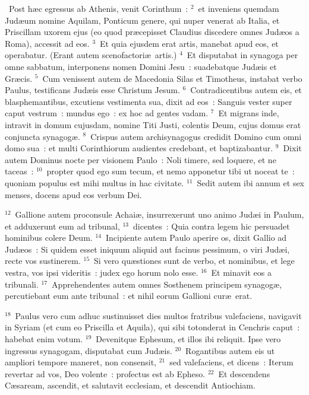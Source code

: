 ~Post h\ae c egressus ab Athenis, venit Corinthum~:
${}^{2}$~et inveniens quemdam Jud\ae um nomine Aquilam, Ponticum genere, qui nuper venerat ab Italia, et Priscillam uxorem ejus (eo quod pr\ae cepisset Claudius discedere omnes Jud\ae os a Roma), accessit ad eos.
${}^{3}$~Et quia ejusdem erat artis, manebat apud eos, et operabatur. (Erant autem scenofactori\ae\ artis.)
${}^{4}$~Et disputabat in synagoga per omne sabbatum, interponens nomen Domini Jesu~: suadebatque Jud\ae is et Gr\ae cis.
${}^{5}$~Cum venissent autem de Macedonia Silas et Timotheus, instabat verbo Paulus, testificans Jud\ae is esse Christum Jesum.
${}^{6}$~Contradicentibus autem eis, et blasphemantibus, excutiens vestimenta sua, dixit ad eos~: Sanguis vester super caput vestrum~: mundus ego~: ex hoc ad gentes vadam.
${}^{7}$~Et migrans inde, intravit in domum cujusdam, nomine Titi Justi, colentis Deum, cujus domus erat conjuncta synagog\ae .
${}^{8}$~Crispus autem archisynagogus credidit Domino cum omni domo sua~: et multi Corinthiorum audientes credebant, et baptizabantur.
${}^{9}$~Dixit autem Dominus nocte per visionem Paulo~: Noli timere, sed loquere, et ne taceas~:
${}^{10}$~propter quod ego sum tecum, et nemo apponetur tibi ut noceat te~: quoniam populus est mihi multus in hac civitate.
${}^{11}$~Sedit autem ibi annum et sex menses, docens apud eos verbum Dei.


${}^{12}$~Gallione autem proconsule Achai\ae , insurrexerunt uno animo Jud\ae i in Paulum, et adduxerunt eum ad tribunal,
${}^{13}$~dicentes~: Quia contra legem hic persuadet hominibus colere Deum.
${}^{14}$~Incipiente autem Paulo aperire os, dixit Gallio ad Jud\ae os~: Si quidem esset iniquum aliquid aut facinus pessimum, o viri Jud\ae i, recte vos sustinerem.
${}^{15}$~Si vero qu\ae stiones sunt de verbo, et nominibus, et lege vestra, vos ipsi videritis~: judex ego horum nolo esse.
${}^{16}$~Et minavit eos a tribunali.
${}^{17}$~Apprehendentes autem omnes Sosthenem principem synagog\ae , percutiebant eum ante tribunal~: et nihil eorum Gallioni cur\ae\ erat.


${}^{18}$~Paulus vero cum adhuc sustinuisset dies multos fratribus valefaciens, navigavit in Syriam (et cum eo Priscilla et Aquila), qui sibi totonderat in Cenchris caput~: habebat enim votum.
${}^{19}$~Devenitque Ephesum, et illos ibi reliquit. Ipse vero ingressus synagogam, disputabat cum Jud\ae is.
${}^{20}$~Rogantibus autem eis ut ampliori tempore maneret, non consensit,
${}^{21}$~sed valefaciens, et dicens~: Iterum revertar ad vos, Deo volente~: profectus est ab Epheso.
${}^{22}$~Et descendens C\ae saream, ascendit, et salutavit ecclesiam, et descendit Antiochiam.


